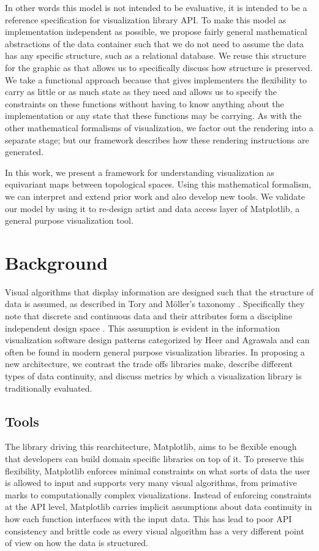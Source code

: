 \documentclass[../main.tex]{subfiles}
\begin{document}
In other words this model is not intended to be evaluative, it is intended to be a reference specification for visualization library API. To make this model as implementation independent as possible, we propose fairly general mathematical abstractions of the data container such that we do not need to assume the data has any specific structure, such as a relational database. We reuse this structure for the graphic as that allows us to specifically discuss how structure is preserved. We take a functional approach because that gives implementers the flexibility to carry as little or as much state as they need and allows us to specify the constraints on these functions without having to know anything about the implementation or any state that these functions may be carrying. As with the other mathematical formalisms of visualization, we factor out the rendering into a separate stage; but our framework describes how these rendering instructions are generated. 

 In this work, we present a framework for understanding visualization as equivariant maps between topological spaces. Using this mathematical formalism, we can interpret and extend prior work and also develop new tools. We validate our model by using it to re-design artist and data access layer of Matplotlib, a general purpose visualization tool.
 

\section{Background}
Visual algorithms that display information are designed such that the structure of data is assumed, as described in Tory and Möller's taxonomy \cite{toryRethinkingVisualizationHighLevel2004}. Specifically they note that discrete and continuous data and their attributes form a discipline independent design space \cite{pousmanCasualInformation2007}. This assumption is evident in the information visualization software design patterns categorized by Heer and Agrawala\cite{HeerSoftware2006} and can often be found in modern general purpose visualization libraries.  In proposing a new architecture, we contrast the trade offs libraries make, describe different types of data continuity, and discuss metrics by which a visualization library is traditionally evaluated. 

\subsection{Tools}
\label{sec:intro_data_tools}
The library driving this rearchitecture, Matplotlib, aims to be flexible enough that developers can build domain specific libraries on top of it. To preserve this flexibility, Matplotlib enforces minimal constraints on what sorts of data the user is allowed to input and supports very many visual algorithms, from primative marks to computationally complex visualizations. Instead of enforcing constraints at the API level, Matplotlib carries implicit assumptions about data continuity in how each function interfaces with the input data. This has lead to poor API consistency and brittle code as every visual algorithm has a very different point of view on how the data is structured. 
\end{document}
